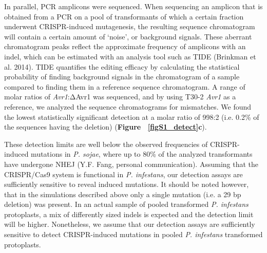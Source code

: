 \documentclass[onecolumn, 11pt,openany]{memoir}
\begin{document}
\begin{multicols}{2}
In parallel, PCR amplicons were sequenced. When sequencing an amplicon that is obtained from a PCR on a pool of transformants of which a certain fraction underwent CRISPR-induced mutagenesis, the resulting sequence chromatogram will contain a certain amount of ‘noise’, or background signals. These aberrant chromatogram peaks reflect the approximate frequency of amplicons with an indel, which can be estimated with an analysis tool such as TIDE (Brinkman et al. 2014). TIDE quantifies the editing efficacy by calculating the statistical probability of finding background signals in the chromatogram of a sample compared to finding them in a reference sequence chromatogram. A range of molar ratios of \textit{Avr1}:ΔAvr1 was sequenced, and by using \mbox{T30-2} \textit{Avr1} as a reference, we analyzed the sequence chromatograms for mismatches. We found the lowest statistically significant detection at a molar ratio of 998:2 (i.e. 0.2\% of the sequences having the deletion) (\textbf{Figure ~\ref{figS1_detect}c}). 

These detection limits are well below the observed frequencies of CRISPR-induced mutations in \textit{P. sojae}, where up to 80\% of the analyzed transformants have undergone NHEJ (Y.F. Fang, personal communication). Assuming that the CRISPR/Cas9 system is functional in \textit{P. infestans}, our detection assays are sufficiently sensitive to reveal induced mutations. It should be noted however, that in the simulations described above only a single mutation (i.e. a 29 bp deletion) was present. In an actual sample of pooled transformed \textit{P. infestans} protoplasts, a mix of differently sized indels is expected and the detection limit will be higher. Nonetheless, we assume that our detection assays are sufficiently sensitive to detect CRISPR-induced mutations in pooled \textit{P. infestans }transformed protoplasts.



\end{multicols}
\end{document}
